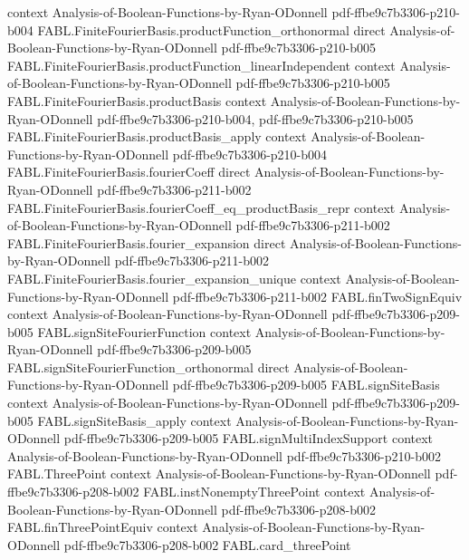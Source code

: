 \begin{theorem}
  {context}
  {Analysis-of-Boolean-Functions-by-Ryan-ODonnell}
  {pdf-ffbe9c7b3306-p210-b004}
\proofstep
  {FABL.FiniteFourierBasis.productFunction_orthonormal}
  {direct}
  {Analysis-of-Boolean-Functions-by-Ryan-ODonnell}
  {pdf-ffbe9c7b3306-p210-b005}
\proofstep
  {FABL.FiniteFourierBasis.productFunction_linearIndependent}
  {context}
  {Analysis-of-Boolean-Functions-by-Ryan-ODonnell}
  {pdf-ffbe9c7b3306-p210-b005}
\proofstep
  {FABL.FiniteFourierBasis.productBasis}
  {context}
  {Analysis-of-Boolean-Functions-by-Ryan-ODonnell}
  {pdf-ffbe9c7b3306-p210-b004,
    pdf-ffbe9c7b3306-p210-b005}
\proofstep
  {FABL.FiniteFourierBasis.productBasis_apply}
  {context}
  {Analysis-of-Boolean-Functions-by-Ryan-ODonnell}
  {pdf-ffbe9c7b3306-p210-b004}
\proofstep
  {FABL.FiniteFourierBasis.fourierCoeff}
  {direct}
  {Analysis-of-Boolean-Functions-by-Ryan-ODonnell}
  {pdf-ffbe9c7b3306-p211-b002}
\proofstep
  {FABL.FiniteFourierBasis.fourierCoeff_eq_productBasis_repr}
  {context}
  {Analysis-of-Boolean-Functions-by-Ryan-ODonnell}
  {pdf-ffbe9c7b3306-p211-b002}
\proofstep
  {FABL.FiniteFourierBasis.fourier_expansion}
  {direct}
  {Analysis-of-Boolean-Functions-by-Ryan-ODonnell}
  {pdf-ffbe9c7b3306-p211-b002}
\proofstep
  {FABL.FiniteFourierBasis.fourier_expansion_unique}
  {context}
  {Analysis-of-Boolean-Functions-by-Ryan-ODonnell}
  {pdf-ffbe9c7b3306-p211-b002}
\proofstep
  {FABL.finTwoSignEquiv}
  {context}
  {Analysis-of-Boolean-Functions-by-Ryan-ODonnell}
  {pdf-ffbe9c7b3306-p209-b005}
\proofstep
  {FABL.signSiteFourierFunction}
  {context}
  {Analysis-of-Boolean-Functions-by-Ryan-ODonnell}
  {pdf-ffbe9c7b3306-p209-b005}
\proofstep
  {FABL.signSiteFourierFunction_orthonormal}
  {direct}
  {Analysis-of-Boolean-Functions-by-Ryan-ODonnell}
  {pdf-ffbe9c7b3306-p209-b005}
\proofstep
  {FABL.signSiteBasis}
  {context}
  {Analysis-of-Boolean-Functions-by-Ryan-ODonnell}
  {pdf-ffbe9c7b3306-p209-b005}
\proofstep
  {FABL.signSiteBasis_apply}
  {context}
  {Analysis-of-Boolean-Functions-by-Ryan-ODonnell}
  {pdf-ffbe9c7b3306-p209-b005}
\proofstep
  {FABL.signMultiIndexSupport}
  {context}
  {Analysis-of-Boolean-Functions-by-Ryan-ODonnell}
  {pdf-ffbe9c7b3306-p210-b002}
\proofstep
  {FABL.ThreePoint}
  {context}
  {Analysis-of-Boolean-Functions-by-Ryan-ODonnell}
  {pdf-ffbe9c7b3306-p208-b002}
\proofstep
  {FABL.instNonemptyThreePoint}
  {context}
  {Analysis-of-Boolean-Functions-by-Ryan-ODonnell}
  {pdf-ffbe9c7b3306-p208-b002}
\proofstep
  {FABL.finThreePointEquiv}
  {context}
  {Analysis-of-Boolean-Functions-by-Ryan-ODonnell}
  {pdf-ffbe9c7b3306-p208-b002}
\proofstep
  {FABL.card_threePoint}

\end{theorem}
